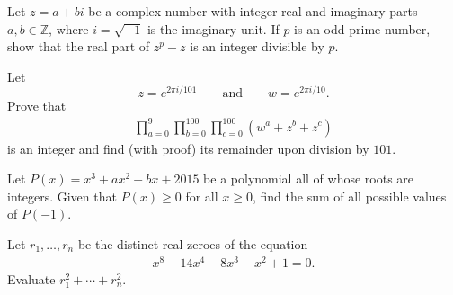\documentclass[11pt]{article}
\theoremstyle{definition}
\begin{document}
%	




\begin{question}[name={2015 HMMT, Team, Problem 3}]
	Let $z=a+bi$ be a complex number with integer real and imaginary parts $a,b \in \mathbb Z$, where $i=\sqrt{-1}$ is the imaginary unit. If $p$ is an odd prime number, show that the real part of $z^p-z$ is an integer divisible by $p$.
\end{question}


%	



\begin{question}[name={2015 HMMT, Team, Problem 9}]
	Let $$z=e^{{2\pi i}/{101}} \qquad \text{and} \qquad  w=e^{{2\pi i}/{10}}.$$
	Prove that
	\begin{align*}
		\prod_{a=0}^{9}\prod_{b=0}^{100}\prod_{c=0}^{100} (w^a+z^b+z^c)
	\end{align*}
	is an integer and find (with proof) its remainder upon division by $101$.
\end{question}


%	






\begin{question}[name={2015 HMMT, Guts, Problem 13}]
	Let $P(x)=x^3+ax^2+bx+2015$ be a polynomial all of whose roots are integers. Given that $P(x) \geq 0$ for all $x\geq 0$, find the sum of all possible values of $P(-1)$.
\end{question}


%	





\begin{question}[name={2015 HMMT, Guts, Problem 25}]
	Let $r_1, \dots, r_n$ be the distinct real zeroes of the equation
	\begin{align*}
		x^8 - 14x^4 - 8x^3 - x^2 + 1 = 0.
	\end{align*}
	Evaluate $r_1^2+\cdots+r_n^2$.
\end{question}
\end{document}
